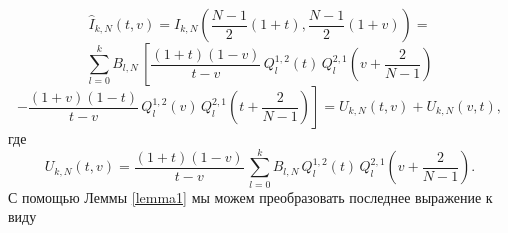 \documentclass[12pt]{book}
\begin{document}
\begin{equation*}
  \hat{I}_{k,N}(t,v) = I_{k,N}\left( \frac{N-1}{2}(1+t) , \frac{N-1}{2}(1+v) \right)=
\end{equation*}
\begin{equation*}
  \sum_{l=0}^{k} B_{l,N} \,
  \left[
    \frac{(1+t)(1-v)}{t-v}\,Q^{1,2}_{l}(t)\,Q^{2,1}_{l}\left(v+\frac{2}{N-1}\right)
  \right.
\end{equation*}
\begin{equation}\label{Usum}
\left.
  - \frac{(1+v)(1-t)}{t-v}\,Q^{1,2}_{l}(v)\,Q^{2,1}_{l}\left(t+\frac{2}{N-1}\right)
\right] = U_{k,N}(t,v) + U_{k,N}(v,t),
\end{equation}
где
\begin{equation}\label{UkN}
  U_{k,N}(t,v)=
  \frac{(1+t)(1-v)}{t-v}\,
  \sum_{l=0}^{k} B_{l,N} \,
    Q^{1,2}_{l}(t)\,Q^{2,1}_{l}\left(v+\frac{2}{N-1}\right).
\end{equation}
С помощью Леммы \eqref{lemma1} мы можем преобразовать последнее выражение к виду
%
%
\end{document}

